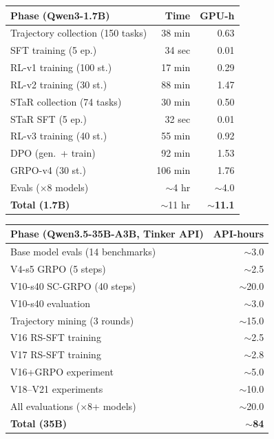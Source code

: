 \documentclass{article}
\begin{document}
\begin{table}[ht]
\vskip 0.1in
\begin{center}
\begin{footnotesize}
\begin{tabular}{lrr}
\toprule
Phase (Qwen3-1.7B) & Time & GPU-h \\
\midrule
Trajectory collection (150 tasks) & 38 min & 0.63 \\
SFT training (5 ep.) & 34 sec & 0.01 \\
RL-v1 training (100 st.) & 17 min & 0.29 \\
RL-v2 training (30 st.) & 88 min & 1.47 \\
STaR collection (74 tasks) & 30 min & 0.50 \\
STaR SFT (5 ep.) & 32 sec & 0.01 \\
RL-v3 training (40 st.) & 55 min & 0.92 \\
DPO (gen.\ + train) & 92 min & 1.53 \\
GRPO-v4 (30 st.) & 106 min & 1.76 \\
Evals ($\times$8 models) & $\sim$4 hr & $\sim$4.0 \\
\midrule
\textbf{Total (1.7B)} & $\sim$11 hr & $\sim$\textbf{11.1} \\
\bottomrule
\end{tabular}
\end{footnotesize}
\end{center}
\vskip 0.1in
\begin{center}
\begin{footnotesize}
\begin{tabular}{lr}
\toprule
Phase (Qwen3.5-35B-A3B, Tinker API) & API-hours \\
\midrule
Base model evals (14 benchmarks) & $\sim$3.0 \\
V4-s5 GRPO (5 steps) & $\sim$2.5 \\
V10-s40 SC-GRPO (40 steps) & $\sim$20.0 \\
V10-s40 evaluation & $\sim$3.0 \\
Trajectory mining (3 rounds) & $\sim$15.0 \\
V16 RS-SFT training & $\sim$2.5 \\
V17 RS-SFT training & $\sim$2.8 \\
V16+GRPO experiment & $\sim$5.0 \\
V18--V21 experiments & $\sim$10.0 \\
All evaluations ($\times$8+ models) & $\sim$20.0 \\
\midrule
\textbf{Total (35B)} & $\sim$\textbf{84} \\
\bottomrule
\end{tabular}
\end{footnotesize}
\end{center}
\vskip -0.15in
\end{table}
\end{document}
